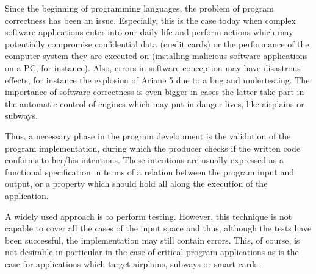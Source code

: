 Since the beginning of programming languages, the problem of program correctness has been an issue. 
Especially, this is the case today when complex software applications  enter into our daily life and perform actions 
which may potentially compromise confidential data (credit cards) or the performance of the
 computer system they are executed on (installing malicious software applications on a PC, for instance). 
Also, errors in software conception may have disastrous effects, for instance 
the explosion of Ariane 5 due to a bug and undertesting. The importance of  software correctness
 is even bigger in cases the latter take part in the automatic 
control of engines which may put in danger lives, like airplains or subways.




Thus, a necessary phase in the program development is the validation of the program implementation, during which 
the producer checks if the written code conforms to her/his intentions. 
These intentions are usually expressed as  a functional specification in terms of a relation between the program
input and output, or a property which  should hold all along the execution of the application. 

A widely used approach is to perform testing. However, this technique is not capable
to cover all the cases of the input space and thus, although the tests have been successful, 
the implementation may still contain errors. This, of course, is not desirable in particular in the case of critical 
program applications as is the case for applications which target airplains, subways or smart cards. 

